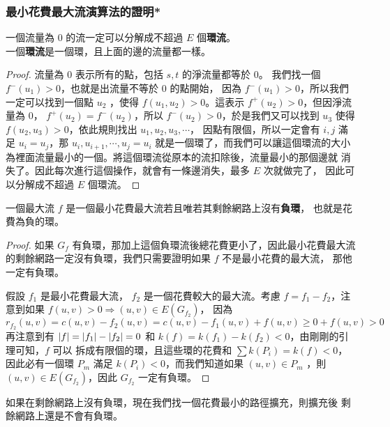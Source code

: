 \documentclass[a4paper,12pt]{book}
\begin{document}
\subsubsection{最小花費最大流演算法的證明*}
\begin{lemma}
  一個流量為 $0$ 的流一定可以分解成不超過 $E$ 個{\bf 環流}。\\
  一個{\bf 環流}是一個環，且上面的邊的流量都一樣。
\end{lemma}
\begin{proof}
  流量為 $0$ 表示所有的點，包括 $s, t$ 的淨流量都等於 $0$。
  我們找一個 $f^-(u_1) > 0$，也就是出流量不等於 $0$ 的點開始，
  因為 $f^-(u_1) > 0$，所以我們一定可以找到一個點 $u_2$ ，使得
  $f(u_1, u_2) > 0$。這表示 $f^+(u_2) > 0$，但因淨流量為 $0$，
  $f^+(u_2) = f^-(u_2)$，所以 $f^-(u_2) > 0$，於是我們又可以找到
  $u_3$ 使得 $f(u_2, u_3) > 0$，依此規則找出 $u_1, u_2, u_3, \cdots$，
  因點有限個，所以一定會有 $i, j$ 滿足 $u_i = u_j$，那
  $u_i, u_{i+1}, \cdots, u_j = u_i$ 就是一個環了，而我們可以讓這個環流的大小
  為裡面流量最小的一個。將這個環流從原本的流扣除後，流量最小的那個邊就
  消失了。因此每次進行這個操作，就會有一條邊消失，最多 $E$ 次就做完了，
  因此可以分解成不超過 $E$ 個環流。
\end{proof}
\begin{simthm}
  一個最大流 $f$ 是一個最小花費最大流若且唯若其剩餘網路上沒有{\bf 負環}，
  也就是花費為負的環。
\end{simthm}
\begin{proof}
  如果 $G_f$ 有負環，那加上這個負環流後總花費更小了，因此最小花費最大流
  的剩餘網路一定沒有負環，我們只需要證明如果 $f$ 不是最小花費的最大流，
  那他一定有負環。

  假設 $f_1$ 是最小花費最大流， $f_2$ 是一個花費較大的最大流。考慮 
  $f = f_1 - f_2$，注意到如果 $f(u, v) > 0 \Rightarrow (u, v) \in E(G_{f_2})$，
  因為 
  \[ r_{f_2}(u, v) = c(u, v) - f_2(u, v) = c(u, v) - f_1(u, v) + f(u, v)
    \geq 0 + f(u, v) > 0 \]
  再注意到有 $\lvert f \rvert = \lvert f_1 \rvert - \lvert f_2 \rvert = 0$ 和 
  $k(f) = k(f_1) - k(f_2) < 0$，由剛剛的引理可知，$f$ 可以
  拆成有限個的環，且這些環的花費和 $\sum k(P_i) = k(f) < 0$，
  因此必有一個環 $P_m$ 滿足 $k(P_i) < 0$，而我們知道如果 $(u, v) \in P_m$
  ，則 $(u, v) \in E(G_{f_2})$，因此 $G_{f_2}$ 一定有負環。
\end{proof}
\begin{simthm}
  如果在剩餘網路上沒有負環，現在我們找一個花費最小的路徑擴充，則擴充後
  剩餘網路上還是不會有負環。
\end{simthm}
\end{document}

